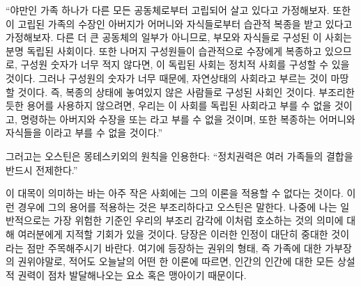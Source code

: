``야만인 가족 하나가 다른 모든 공동체로부터 고립되어 살고 있다고 가정해보자.
또한 이 고립된 가족의 수장인 아버지가 어머니와 자식들로부터
습관적 복종을 받고 있다고 가정해보자.
다른 더 큰 공동체의 일부가 아니므로,
부모와 자식들로 구성된 이 사회는 분명 독립된 사회이다.
또한 나머지 구성원들이 습관적으로 수장에게 복종하고 있으므로,
구성원 숫자가 너무 적지 않다면, 이 독립된 사회는 정치적 사회를
구성할 수 있을 것이다.
그러나 구성원의 숫자가 너무  때문에, 자연상태의 사회라고
부르는 것이 마땅할 것이다.
즉, 복종의 상태에 놓여있지 않은 사람들로 구성된 사회인 것이다.
부조리한 듯한 용어를 사용하지 않으려면,
우리는 이 사회를  독립된 사회라고 부를 수 없을 것이고,
명령하는 아버지와 수장을  또는 라고
부를 수 없을 것이며,
또한 복종하는 어머니와 자식들을 이라고 부를 수 없을 것이다.''

그러고는 오스틴은 몽테스키외의 원칙을 인용한다:
``정치권력은 여러 가족들의 결합을 반드시 전제한다.''

이 대목이 의미하는 바는 아주 작은 사회에는 그의 이론을 적용할 수
없다는 것이다.
이런 경우에 그의 용어를 적용하는 것은 부조리하다고 오스틴은 말한다.
나중에 나는 일반적으로는 가장 위험한 기준인 우리의 부조리 감각에
이처럼 호소하는 것의 의미에 대해
여러분에게 지적할 기회가 있을 것이다.
당장은 이러한 인정이 대단히 중대한 것이라는 점만 주목해주시기 바란다.
여기에 등장하는 권위의 형태, 즉
가족에 대한 가부장의 권위야말로,
적어도 오늘날의 어떤 한 이론에 따르면,
인간의 인간에 대한 모든 상설적 권력이 점차 발달해나오는
요소 혹은 맹아이기 때문이다.

